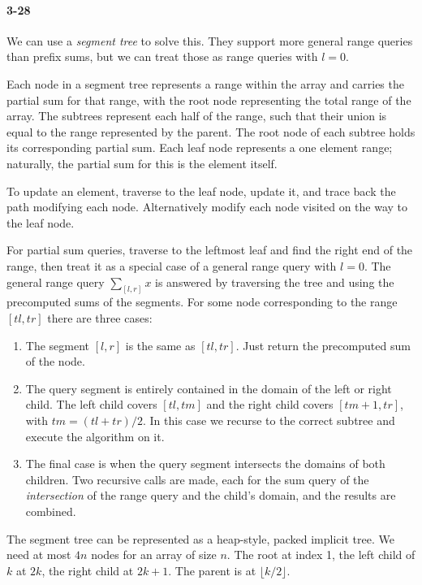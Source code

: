 \documentclass{report}
\begin{document}
\paragraph{3-28} We can use a \emph{segment tree} to solve this. They support more general range queries than prefix sums, but we can treat those as range queries with $l=0$.

Each node in a segment tree represents a range within the array and carries the partial sum for that range, with the root node representing the total range of the array. The subtrees represent each half of the range, such that their union is equal to the range represented by the parent. The root node of each subtree holds its corresponding partial sum. Each leaf node represents a one element range; naturally, the partial sum for this is the element itself.


To update an element, traverse to the leaf node, update it, and trace back the path modifying each node. Alternatively modify each node visited on the way to the leaf node.

For partial sum queries, traverse to the leftmost leaf and find the right end of the range, then treat it as a special case of a general range query with $l=0$. The general range query $\sum_{[l,r]} x$ is answered by traversing the tree and using the precomputed sums of the segments. For some node corresponding to the range $[tl,tr]$ there are three cases:

\begin{enumerate}
	\item The segment $[l,r]$ is the same as $[tl,tr]$. Just return the precomputed sum of the node.
	\item The query segment is entirely contained in the domain of the left or right child. The left child covers $[tl,tm]$ and the right child covers $[tm+1, tr]$, with $tm=(tl+tr)/2$. In this case we recurse to the correct subtree and execute the algorithm on it.
	\item The final case is when the query segment intersects the domains of both children. Two recursive calls are made, each for the sum query of the \emph{intersection} of the range query and the child's domain, and the results are combined.
\end{enumerate}

The segment tree can be represented as a heap-style, packed implicit tree. We need at most $4n$ nodes for an array of size $n$. The root at index 1, the left child of $k$ at $2k$, the right child at $2k+1$. The parent is at $\lfloor k/2\rfloor$.
\end{document}
